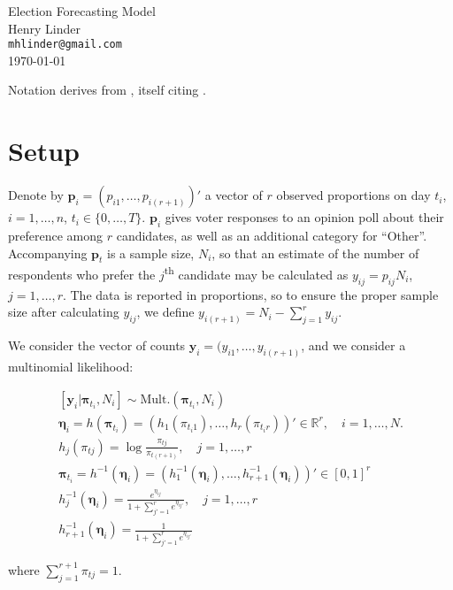 \documentclass{article}
\title{}
\author{Henry Linder \\ \texttt{mhlinder@gmail.com}}
\date{\today}
\begin{document}
{
  \centering
  \Large Election Forecasting Model \\[1em]
  \normalsize Henry Linder \\
  \texttt{mhlinder@gmail.com} \\
  \today \\[2em]
  \par
}

Notation derives from \cite{cargnoni1997bayesian}, itself citing
\cite{west1997}.

\section{Setup}

Denote by $\mathbf{p}_{i}=(p_{i1}, \dots,p_{i(r+1)})'$ a vector of $r$
observed proportions on day $t_{i}$, $i=1,\dots,n$,
$t_{i}\in\{0,\dots,T\}$. $\mathbf{p}_{i}$ gives voter responses to an
opinion poll about their preference among $r$ candidates, as well as
an additional category for ``Other''. Accompanying $\mathbf{p}_{t}$ is
a sample size, $N_{i}$, so that an estimate of the number of
respondents who prefer the $j$\textsuperscript{th} candidate may be
calculated as $y_{ij}=p_{ij}N_{i}$, $j=1,\dots,r$. The data is
reported in proportions, so to ensure the proper sample size after
calculating $y_{ij}$, we define $y_{i(r+1)} = N_{i} -
\sum_{j=1}^{r}y_{ij}$.

We consider the vector of counts
$\mathbf{y}_{i}=(y_{i1},\dots,y_{i(r+1)}$, and we consider a
multinomial likelihood:

\begin{gather}
  \left[ \mathbf{y}_{i}|\bm\pi_{t_{i}}, N_{i} \right]\sim
  \text{Mult.}(\bm\pi_{t_{i}}, N_{i}) \\
  \bm\eta_{i} = h(\bm\pi_{t_{i}}) = (h_{1}(\pi_{t_{i}1}), \dots,
  h_{r}(\pi_{t_{i}r}))'\in\mathbb{R}^{r}, \quad i=1,\dots, N. \\
  h_{j}(\pi_{tj}) = \log\frac{\pi_{tj}}{\pi_{t(r+1)}}, \quad
  j=1,\dots, r \\
  \bm\pi_{t_{i}} = h^{-1}(\bm\eta_{i}) = (h_{1}^{-1}(\bm\eta_{i}), \dots,
  h_{r+1}^{-1}(\bm\eta_{i}))' \in [0,1]^{r} \\
  h_{j}^{-1}(\bm\eta_{i}) =
  \frac{e^{\eta_{ij}}}{1+\sum_{j'=1}^{r}e^{\eta_{ij'}}}, \quad
  j=1,\dots, r\\
  h_{r+1}^{-1}(\bm\eta_{i}) = \frac{1}{1+\sum_{j'=1}^{r}e^{\eta_{ij'}}}
\end{gather}

where $\sum_{j=1}^{r+1}\pi_{tj}=1$.
\end{document}

